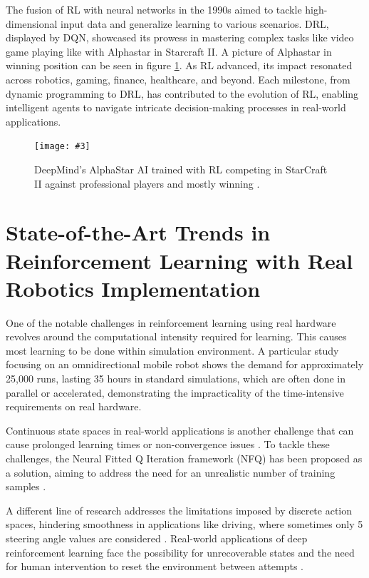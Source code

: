 \documentclass[12pt]{report}
\newcommand\insertfigure[5]{
\begin{figure}[#1]
\begin{center}
\texttt{[image: \#3]}
\end{center}
\caption{#4}
\label{#5}
\end{figure}
}
\begin{document}
The fusion of RL with neural networks in the 1990s aimed to tackle high-dimensional input data and generalize learning to various scenarios. DRL, displayed by DQN, showcased its prowess in mastering complex tasks like video game playing like with Alphastar \cite{bib:alphastar} in Starcraft II. A picture of Alphastar in winning position can be seen in figure \ref{fig:alphastar}.
As RL advanced, its impact resonated across robotics, gaming, finance, healthcare, and beyond. Each milestone, from dynamic programming to DRL, has contributed to the evolution of RL, enabling intelligent agents to navigate intricate decision-making processes in real-world applications.




\insertfigure{th}{0.8\textwidth}{alphastar.jpg}{DeepMind's AlphaStar AI trained with RL competing in StarCraft II against professional players and mostly winning \cite{bib:alphastar}.}{fig:alphastar}

\newpage

\section{State-of-the-Art Trends in Reinforcement Learning with Real Robotics Implementation}
\label{sub:SOTA_trends_RL}

One of the notable challenges in reinforcement learning using real hardware revolves around the computational intensity required for learning.  This causes most learning to be done within simulation environment.  A particular study focusing on an omnidirectional mobile robot \cite{bib:omnidirectional} shows the demand for approximately 25,000 runs, lasting 35 hours in standard simulations, which are often done in parallel or accelerated, demonstrating the impracticality of the time-intensive requirements on real hardware.


Continuous state spaces in real-world applications is another challenge that can cause prolonged learning times or non-convergence issues \cite{bib:NRL}. To tackle these challenges, the Neural Fitted Q Iteration framework (NFQ) has been proposed as a solution, aiming to address the need for an unrealistic number of training samples \cite{bib:NRL}.


A different line of research addresses the limitations imposed by discrete action spaces, hindering smoothness in applications like driving, where sometimes only 5 steering angle values are considered \cite{bib:drivesim}. Real-world applications of deep reinforcement learning face the possibility for unrecoverable states and the need for human intervention to reset the environment between attempts \cite{bib:reset}.
\end{document}

